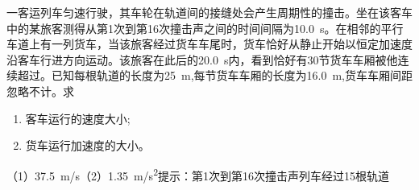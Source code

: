 一客运列车匀速行驶，其车轮在轨道间的接缝处会产生周期性的撞击。坐在该客车中的某旅客测得从第1次到第16次撞击声之间的时间间隔为\qty{10.0}{s}。在相邻的平行车道上有一列货车，当该旅客经过货车车尾时，货车恰好从静止开始以恒定加速度沿客车行进方向运动。该旅客在此后的\qty{20.0}{s}内，看到恰好有30节货车车厢被他连续超过。已知每根轨道的长度为\qty{25}{m},每节货车车厢的长度为\qty{16.0}{m},货车车厢间距忽略不计。求
\begin{enumerate}
	\item 客车运行的速度大小; 
	\item 货车运行加速度的大小。
\end{enumerate}
\begin{answer}
	（1）\qty{37.5}{m/s}（2）\qty{1.35}{m/s^2}\qquad 提示：第1次到第16次撞击声列车经过15根轨道
\end{answer}